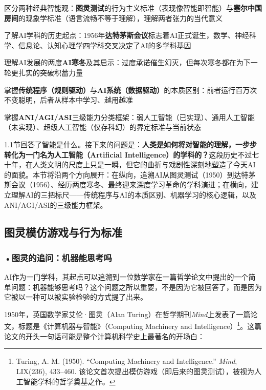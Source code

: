 \begin{sectionkeypoints}
\item 区分两种经典智能观：\textbf{图灵测试}的行为主义标准（表现像智能即智能）与\textbf{塞尔中国房间}的现象学标准（语言流畅不等于理解），理解两者张力的当代意义
\item 了解AI学科的历史起点：1956年\textbf{达特茅斯会议}标志着AI正式诞生，数学、神经科学、信息论、认知心理学四学科交叉决定了AI的多学科基因
\item 理解AI发展的两度\textbf{AI寒冬}及其启示：过度承诺催生幻灭，但每次寒冬都在为下一轮更扎实的突破积蓄力量
\item 掌握\textbf{传统程序（规则驱动）}与\textbf{AI系统（数据驱动）}的本质区别：前者运行百万次不变聪明，后者从样本中学习、越用越准
\item 掌握\textbf{ANI/AGI/ASI}三级能力分类框架：弱人工智能（已实现）、通用人工智能（未实现）、超级人工智能（仅存科幻）的界定标准与当前状态
\end{sectionkeypoints}

\vspace{8pt}

1.1节回答了智能是什么。接下来的问题是：\textbf{人类是如何将对智能的理解，一步步转化为一门名为人工智能（Artificial Intelligence）的学科的？}这段历史不过七十年，在人类文明的尺度上只是一瞬，但它的曲折与戏剧性深刻地塑造了今天AI的面貌。本节将沿两个方向展开：在纵向，追溯AI从图灵测试（1950）到达特茅斯会议（1956）、经历两度寒冬、最终迎来深度学习革命的学科演进；在横向，建立理解AI的三把标尺——传统程序与AI的本质区别、机器学习的核心逻辑，以及ANI/AGI/ASI的三级能力框架。

\subsection{图灵模仿游戏与行为标准}

\subsubsection*{\textbf{•图灵的追问：机器能思考吗}}

AI作为一门学科，其起点可以追溯到一位数学家在一篇哲学论文中提出的一个简单问题：机器能够思考吗？这个问题之所以重要，不是因为它被回答了，而是因为它被以一种可以被实验检验的方式提了出来。

1950年，英国数学家艾伦·图灵（Alan Turing）在哲学期刊\emph{Mind}上发表了一篇论文，标题是《计算机器与智能》（Computing Machinery and Intelligence）\footnote{Turing, A. M. (1950). ``Computing Machinery and Intelligence.'' \emph{Mind}, LIX(236), 433--460. 该论文首次提出模仿游戏（即后来的图灵测试），被视为人工智能学科的哲学奠基之作。}。这篇论文的开头一句话可能是整个计算机科学史上最著名的开场白：

